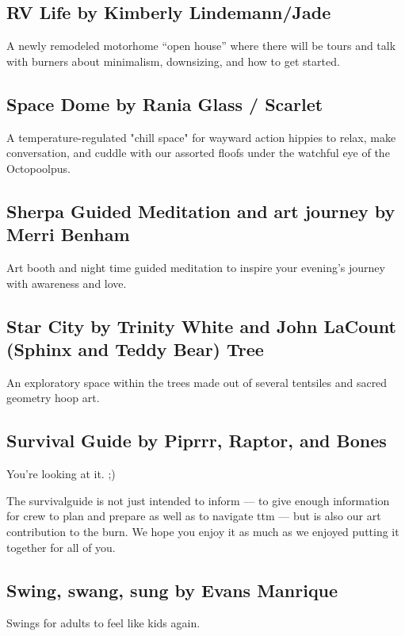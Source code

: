 \begin{multicols}{2}
\subsection*{RV Life by Kimberly Lindemann/Jade                }
A newly remodeled motorhome “open house” where there will be tours and talk with burners about minimalism, downsizing, and how to get started. 


\subsection*{Space Dome        by Rania Glass / Scarlet        }
A temperature-regulated "chill space" for wayward action hippies to relax, make conversation, and cuddle with our assorted floofs under the watchful eye of the Octopoolpus.        


\subsection*{Sherpa Guided Meditation and art journey by Merri Benham         }
Art booth and night time guided meditation to inspire your evening's journey with awareness and love.


\subsection*{Star City by Trinity White and John LaCount (Sphinx and Teddy Bear)                Tree        }
An exploratory space within the trees made out of several tentsiles and sacred geometry hoop art.


\subsection*{Survival Guide by Piprrr, Raptor, and Bones}

You're looking at it.  ;)

The \gls{survivalguide} is not just intended to inform --- to give enough information for crew to plan and prepare as well as to navigate \gls{ttm} --- but is also our art contribution to the burn.  We hope you enjoy it as much as we enjoyed putting it together for all of you.



\subsection*{Swing, swang, sung by Evans Manrique                 }
        Swings for adults to feel like kids again.        





\end{multicols}
